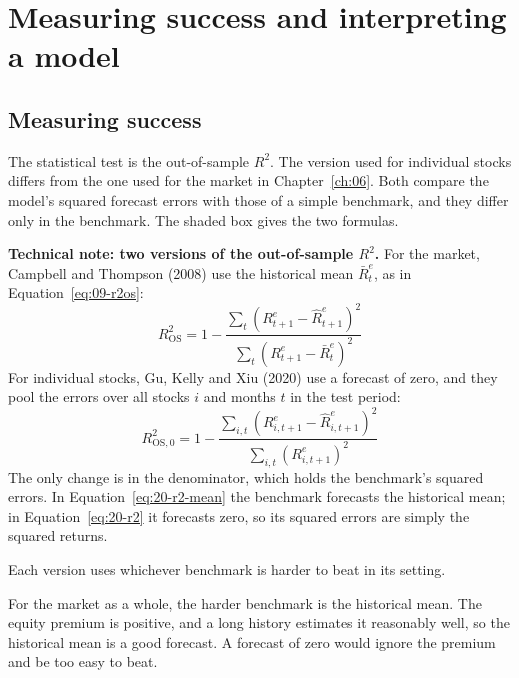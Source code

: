 \section{Measuring success and interpreting a model}
\label{sec:20-measure}

\subsection{Measuring success}

The statistical test is the out-of-sample $R^2$. The version used for individual stocks differs from the one used for the market in Chapter~\ref{ch:06}. Both compare the model's squared forecast errors with those of a simple benchmark, and they differ only in the benchmark. The shaded box gives the two formulas.

\begin{technote}
\textbf{Technical note: two versions of the out-of-sample $R^2$.} For the market, Campbell and Thompson (2008) use the historical mean $\bar{R}^{e}_t$, as in Equation~\eqref{eq:09-r2os}:
\begin{equation}
  R^2_{\text{OS}} = 1 - \frac{\sum_{t} \left(R^{e}_{t+1} - \hat{R}^{e}_{t+1}\right)^2}{\sum_{t} \left(R^{e}_{t+1} - \bar{R}^{e}_t\right)^2}
  \label{eq:20-r2-mean}
\end{equation}
For individual stocks, Gu, Kelly and Xiu (2020) use a forecast of zero, and they pool the errors over all stocks $i$ and months $t$ in the test period:
\begin{equation}
  R^2_{\text{OS},0} = 1 - \frac{\sum_{i,t} \left(R^{e}_{i,t+1} - \hat{R}^{e}_{i,t+1}\right)^2}{\sum_{i,t} \left(R^{e}_{i,t+1}\right)^2}
  \label{eq:20-r2}
\end{equation}
The only change is in the denominator, which holds the benchmark's squared errors. In Equation~\eqref{eq:20-r2-mean} the benchmark forecasts the historical mean; in Equation~\eqref{eq:20-r2} it forecasts zero, so its squared errors are simply the squared returns.
\end{technote}

Each version uses whichever benchmark is harder to beat in its setting.

For the market as a whole, the harder benchmark is the historical mean. The equity premium is positive, and a long history estimates it reasonably well, so the historical mean is a good forecast. A forecast of zero would ignore the premium and be too easy to beat.

